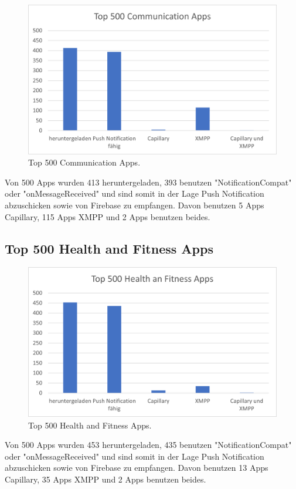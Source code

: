 \documentclass[sigconf]{acmart}
\begin{document}
\begin{figure}[H]
  \centering
  \includegraphics[width=\linewidth]{sample-auswertung1}
  \caption{Top 500 Communication Apps.}
\end{figure}
Von 500 Apps wurden 413 heruntergeladen, 393 benutzen "NotificationCompat" oder "onMessageReceived" 
und sind somit in der Lage Push Notification abzuschicken sowie von Firebase zu empfangen. Davon benutzen 5 Apps Capillary, 115 Apps XMPP 
und 2 Apps benutzen beides.

\subsection{Top 500 Health and Fitness Apps}
\begin{figure}[H]
  \centering
  \includegraphics[width=\linewidth]{sample-auswertung2}
  \caption{Top 500 Health and Fitness Apps.}
\end{figure}
Von 500 Apps wurden 453 heruntergeladen, 435 benutzen "NotificationCompat" oder "onMessageReceived" 
und sind somit in der Lage Push Notification abzuschicken sowie von Firebase zu empfangen. Davon benutzen 13 Apps Capillary, 
35 Apps XMPP und 2 Apps benutzen beides.
\end{document}
